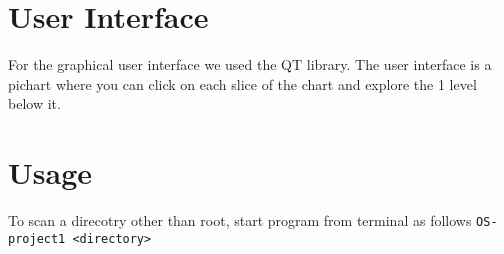 \documentclass[]{article}
\begin{document}
    \section{User Interface}
    For the graphical user interface we used the QT library. The user interface is a pichart where you can click on each slice of the chart and explore the 1 level below it.

    \section{Usage}
    To scan a direcotry other than root, start program from terminal as follows
    \texttt{OS-project1 <directory>}
    
\end{document}
